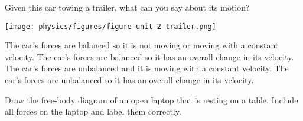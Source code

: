 \documentclass[answers]{exam}
\newif\ifversionKlevel
\begin{document}
\begin{questions}
\question
Given this car towing a trailer, what can you say about its motion?

\begin{center}
    \texttt{[image: physics/figures/figure-unit-2-trailer.png]}
\end{center}

\begin{randomizechoices}
    \choice The car’s forces are balanced so it is not moving or moving with a constant velocity.
    \choice The car’s forces are balanced so it has an overall change in its velocity.
    \choice The car’s forces are unbalanced and it is moving with a constant velocity.
    \correctchoice The car’s forces are unbalanced so it has an overall change in its velocity.    
\end{randomizechoices}


\ifversionKlevel
\begin{EnvUplevel}
    \textbf{Questions \ref{71tbo}--\ref{3M4Xb}.} The free-body diagram below represents an object moving to the left.
\end{EnvUplevel}


\begin{center}
    \begin{tikzpicture}
        \fill (0,0) circle (5pt);
        \draw[ultra thick,<->] (0,-1) -- (0,1);
        \draw[ultra thick,<->] (-1,0) -- (1,0);
    \end{tikzpicture}
\end{center}

\question \label{71tbo}
The object is\dots .

\begin{randomizechoices}[keeplast]
    \choice speeding up
    \choice slowing down
    \correctchoice moving at constant speed 
    \choice none of the above
\end{randomizechoices}

\question \label{3M4Xb}
Are the force on the object balanced or unbalanced?

\begin{randomizeoneparchoices}[norandomize]
    \correctchoice balanced
    \choice unbalanced
\end{randomizeoneparchoices}

\fi

\clearpage

\ifprintanswers
{
    \huge
    \printkeytable
}
\fi

\clearpage

\question[3]
Draw the free-body diagram of an open laptop that is resting on a table. Include all forces on the laptop and label them correctly. 


\end{questions}
\end{document}
